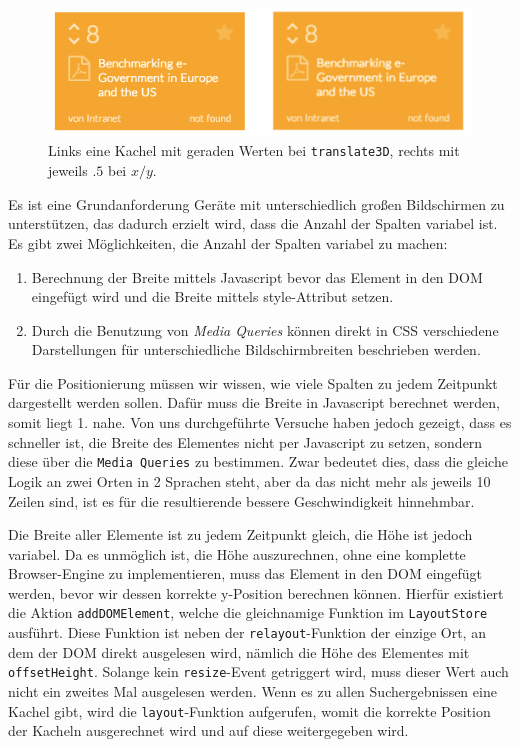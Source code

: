 \documentclass[12pt,twoside]{book}
\begin{document}
\begin{enumerate}
\begin{figure}[htbp]
	\centering
	\includegraphics[width=1.0\textwidth]{images/blurry_tiles.png}
	\caption{Links eine Kachel mit geraden Werten bei \texttt{translate3D}, rechts mit jeweils $.5$ bei $x/y$.}
	\label{fig:blurry}
\end{figure}

\end{enumerate}

Es ist eine Grundanforderung Geräte mit unterschiedlich großen Bildschirmen zu unterstützen, das dadurch erzielt wird, dass die Anzahl der Spalten variabel ist.
Es gibt zwei Möglichkeiten, die Anzahl der Spalten variabel zu machen:

\begin{enumerate}
  \item Berechnung der Breite mittels Javascript bevor das Element in den DOM eingefügt wird und die Breite mittels style-Attribut setzen.
  \item Durch die Benutzung von \textit{Media Queries} können direkt in CSS verschiedene Darstellungen für unterschiedliche Bildschirmbreiten beschrieben werden.
\end{enumerate}

Für die Positionierung müssen wir wissen, wie viele Spalten zu jedem Zeitpunkt dargestellt werden sollen. Dafür muss die Breite in Javascript berechnet werden, somit liegt 1. nahe. Von uns durchgeführte Versuche haben jedoch gezeigt, dass es schneller ist, die Breite des Elementes nicht per Javascript zu setzen, sondern diese über die \texttt{Media Queries} zu bestimmen. Zwar bedeutet dies, dass die gleiche Logik an zwei Orten in 2 Sprachen steht, aber da das nicht mehr als jeweils 10 Zeilen sind, ist es für die resultierende bessere Geschwindigkeit hinnehmbar.

Die Breite aller Elemente ist zu jedem Zeitpunkt gleich, die Höhe ist jedoch variabel. Da es unmöglich ist, die Höhe auszurechnen, ohne eine komplette Browser-Engine zu implementieren, muss das Element in den DOM eingefügt werden, bevor wir dessen korrekte y-Position berechnen können. Hierfür existiert die Aktion \texttt{addDOMElement}, welche die gleichnamige Funktion im \texttt{LayoutStore} ausführt. Diese Funktion ist neben der \texttt{relayout}-Funktion der einzige Ort, an dem der DOM direkt ausgelesen wird, nämlich die Höhe des Elementes mit \texttt{offsetHeight}. Solange kein \texttt{resize}-Event getriggert wird, muss dieser Wert auch nicht ein zweites Mal ausgelesen werden.
Wenn es zu allen Suchergebnissen eine Kachel gibt, wird die \texttt{layout}-Funktion aufgerufen, womit die korrekte Position der Kacheln ausgerechnet wird und auf diese weitergegeben wird.
\end{document}
